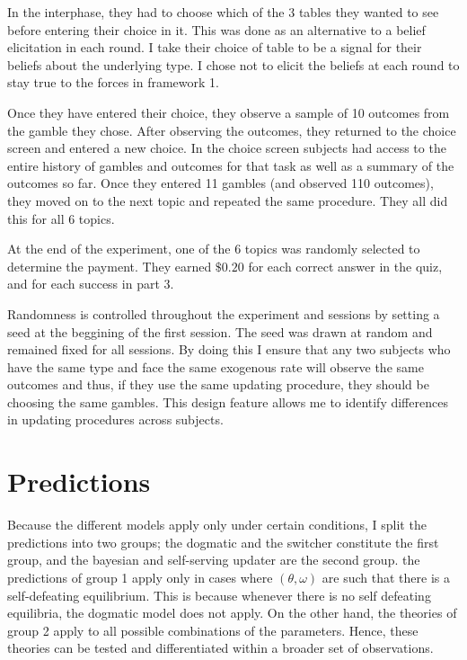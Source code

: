 \documentclass[
  12pt,
]{article}
\begin{document}
In the interphase, they had to choose which of the 3 tables they wanted
to see before entering their choice in it. This was done as an
alternative to a belief elicitation in each round. I take their choice
of table to be a signal for their beliefs about the underlying type. I
chose not to elicit the beliefs at each round to stay true to the forces
in framework 1.

Once they have entered their choice, they observe a sample of 10
outcomes from the gamble they chose. After observing the outcomes, they
returned to the choice screen and entered a new choice. In the choice
screen subjects had access to the entire history of gambles and outcomes
for that task as well as a summary of the outcomes so far. Once they
entered 11 gambles (and observed 110 outcomes), they moved on to the
next topic and repeated the same procedure. They all did this for all 6
topics.

At the end of the experiment, one of the 6 topics was randomly selected
to determine the payment. They earned \(\$0.20\) for each correct answer
in the quiz, and for each success in part 3.

Randomness is controlled throughout the experiment and sessions by
setting a seed at the beggining of the first session. The seed was drawn
at random and remained fixed for all sessions. By doing this I ensure
that any two subjects who have the same type and face the same exogenous
rate will observe the same outcomes and thus, if they use the same
updating procedure, they should be choosing the same gambles. This
design feature allows me to identify differences in updating procedures
across subjects.

\hypertarget{predictions}{%
\section{Predictions}\label{predictions}}

Because the different models apply only under certain conditions, I
split the predictions into two groups; the dogmatic and the switcher
constitute the first group, and the bayesian and self-serving updater
are the second group. the predictions of group 1 apply only in cases
where \((\theta, \omega)\) are such that there is a self-defeating
equilibrium. This is because whenever there is no self defeating
equilibria, the dogmatic model does not apply. On the other hand, the
theories of group 2 apply to all possible combinations of the
parameters. Hence, these theories can be tested and differentiated
within a broader set of observations.
\end{document}
